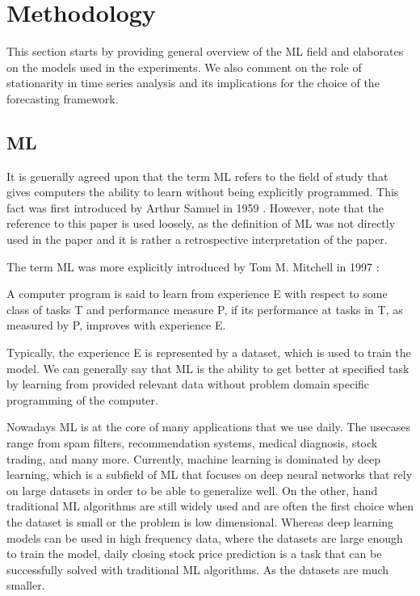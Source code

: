 \chapter{Methodology}
\label{chap:four}

This section starts by providing general
overview of the \ac{ML} field and elaborates 
on the models used in the experiments. 
We also comment on the role of stationarity in time series analysis
and its implications for the choice of the forecasting framework.

\section{\acl{ML}}

It is generally agreed upon that the term 
\ac{ML} refers to the field of study that gives computers the ability to learn 
without being explicitly programmed. This fact was first 
introduced by Arthur Samuel in 1959 \cite{Samuel1959}. However, note that the reference to this paper is used
loosely, as the definition of \ac{ML} was not directly used in the paper and it is rather 
a retrospective interpretation of the paper. 

The term \ac{ML} was more explicitly introduced by Tom M. Mitchell in 1997 \cite{Mitchell1997}:

\begin{defin}\label{de:ml}
    A computer program is said to learn from experience E with respect
    to some class of tasks T and performance measure P, if its performance at tasks in
    T, as measured by P, improves with experience E. 
\end{defin}

Typically, the experience E is represented by a dataset, which is used to train the model. 
We can generally say that \ac{ML} is the ability to get better at specified task by learning
from provided relevant data without problem domain specific programming of the computer.


Nowadays \ac{ML} is at the core of many applications that we use daily. The usecases range from
spam filters, recommendation systems, medical diagnosis, stock trading, and many more. Currently, 
machine learning is dominated by deep learning, which is a subfield of \ac{ML} that focuses on
deep neural networks that rely on large datasets in order to be able to generalize well.
On the other, hand traditional \ac{ML} algorithms are still widely used and are often the first choice
when the dataset is small or the problem is low dimensional. Whereas deep learning models
can be used in high frequency data, where the datasets are large enough to train the model, 
daily closing stock price prediction is a task that can be successfully solved with 
traditional \ac{ML} algorithms. As the datasets are much smaller. 


